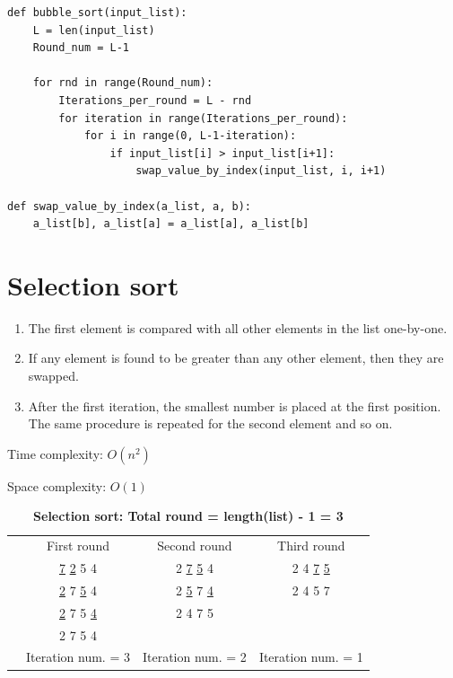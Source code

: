 \documentclass[a4paper,11pt]{book}
\begin{document}
% 
\begin{lstlisting}
def bubble_sort(input_list):
	L = len(input_list)
	Round_num = L-1

	for rnd in range(Round_num):
		Iterations_per_round = L - rnd
		for iteration in range(Iterations_per_round):
			for i in range(0, L-1-iteration):
				if input_list[i] > input_list[i+1]:
					swap_value_by_index(input_list, i, i+1)

def swap_value_by_index(a_list, a, b):
    a_list[b], a_list[a] = a_list[a], a_list[b]
\end{lstlisting}

\newpage
\section{Selection sort}

\begin{enumerate}
	\item The first element is compared with all other elements in the list one-by-one.
	\item If any element is found to be greater than any other element, then they are swapped.
	\item After the first iteration, the smallest number is placed at the first position. The same procedure is repeated for the second element and so on.
\end{enumerate}

\noindent Time complexity: $O(n^2)$

\noindent Space complexity: $O(1)$

\begin{table}[h]
	\label{Selection sort}
	\caption{\textbf{Selection sort: Total round = length(list) - 1 = 3}}
	\vspace{2mm}
	\centering
	\begin{tabular}{cccc}
		&{First round}  &{Second round}  &{Third round}   \\
		&\underline{7} \underline{2} 5 4  &2 \underline{7} \underline{5} 4 &2 4 \underline{7} \underline{5}   \\
		&\underline{2} 7 \underline{5} 4 &2 \underline{5} 7 \underline{4}  &2 4 5 7   \\
		&\underline{2} 7 5 \underline{4}  &2 4 7 5 &   \\
		&2 7 5 4  & &\\
		&Iteration num. = 3 &Iteration num. = 2 &Iteration num. = 1 
	\end{tabular}
\end{table}
\end{document}
